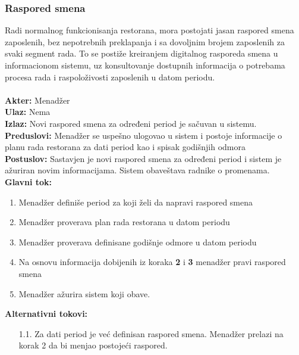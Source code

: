 \documentclass{article}
\begin{document}
\subsubsection{Raspored smena}
Radi normalnog funkcionisanja restorana, mora postojati jasan raspored smena zaposlenih, bez nepotrebnih preklapanja i sa dovoljnim brojem zaposlenih za svaki segment rada. To se postiže kreiranjem digitalnog rasporeda smena u informacionom sistemu, uz konsultovanje dostupnih informacija o potrebama procesa rada i raspoloživosti zaposlenih u datom periodu.\\\\
\textbf{Akter:} Menadžer\\
\textbf{Ulaz:} Nema\\
\textbf{Izlaz:} Novi raspored smena za određeni period je sačuvan u sistemu.\\
\textbf{Preduslovi:} Menadžer se uspešno ulogovao u sistem i postoje informacije o planu rada restorana za dati period kao i spisak godišnjih odmora\\
\textbf{Postuslov:} Sastavjen je novi raspored smena za određeni period i sistem je ažuriran novim informacijama. Sistem obaveštava radnike o promenama.\\
\textbf{Glavni tok:} 
\begin{enumerate}
\item Menadžer definiše period za koji želi da napravi raspored smena
\item Menadžer proverava plan rada restorana u datom periodu
\item Menadžer proverava definisane godišnje odmore u datom periodu
\item Na osnovu informacija dobijenih iz koraka \textbf{2} i \textbf{3} menadžer pravi raspored smena
\item Menadžer ažurira sistem koji obave.
\end{enumerate}

\textbf{Alternativni tokovi:} \\
\begin{itemize}
\item [1.1.] Za dati period je već definisan raspored smena. Menadžer prelazi na korak 2 da bi menjao postojeći raspored.
\end{itemize}
\end{document}
